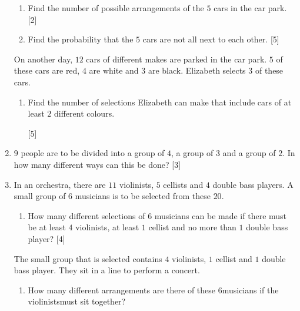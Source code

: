 \begin{enumerate}
\begin{enumerate}[label=(\roman*)]
	\item Find the number of possible arrangements of the $5$ cars in the car park. \hfill[2]
	\item Find the probability that the $5$ cars are not all next to each other. \hfill[5]
\end{enumerate}
On another day, $12$ cars of different makes are parked in the car park. $5$ of these cars are red, $4$ are white and $3$ are black. Elizabeth selects $3$ of these cars.
\begin{enumerate}[resume,label=(\roman*)]
	\item Find the number of selections Elizabeth can make that include cars of at least $2$ different colours. 
	
	
	\quad \hfill	[5]
\end{enumerate}




\item  $9$ people are to be divided into a group of $4$, a group of $3$ and a group of $2$. In how many different ways can this be done? \hfill[3]



\item  In an orchestra, there are $11$ violinists, $5$ cellists and $4$ double bass players. A small group of $6$ musicians is to be selected from these $20$.

\begin{enumerate}[label=(\roman*)]
	\item How many different selections of $6$ musicians can be made if there must be at least $4$ violinists,	at least $1$ cellist and no more than $1$ double bass player? \hfill[4]
\end{enumerate}

The small group that is selected contains $4$ violinists, $1$ cellist and $1$ double bass player. They sit in a line to perform a concert.

\begin{enumerate}[resume,label=(\roman*)]
	\item How many different arrangements are there of these 6musicians if the violinistsmust sit together?
	

\end{enumerate}
\end{enumerate}
